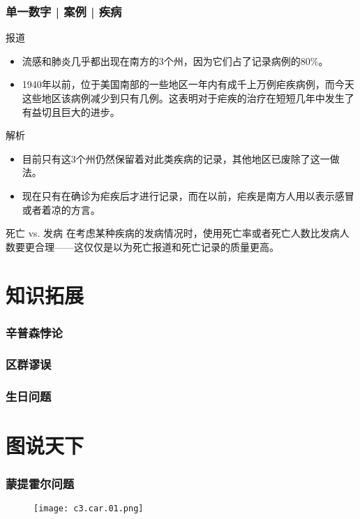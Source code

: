 \begin{frame}
  \frametitle{单一数字 | 案例 | 疾病}
  \begin{block}{报道}
    \begin{itemize}
      \item 流感和肺炎几乎都出现在南方的3个州，因为它们占了记录病例的80\%。
      \item 1940年以前，位于美国南部的一些地区一年内有成千上万例疟疾病例，而今天这些地区该病例减少到只有几例。这表明对于疟疾的治疗在短短几年中发生了有益切且巨大的进步。
    \end{itemize}
  \end{block}
  \pause
  \begin{block}{解析}
    \begin{itemize}
      \item 目前只有这3个州仍然保留着对此类疾病的记录，其他地区已废除了这一做法。
      \item 现在只有在确诊为疟疾后才进行记录，而在以前，疟疾是南方人用以表示感冒或者着凉的方言。
    \end{itemize}
  \end{block}
  \pause
  \begin{block}{死亡 vs. 发病}
    在考虑某种疾病的发病情况时，使用死亡率或者死亡人数比发病人数要更合理——这仅仅是以为死亡报道和死亡记录的质量更高。
  \end{block}
\end{frame}

\section{知识拓展}
\begin{frame}
  \frametitle{辛普森悖论}
\end{frame}

\begin{frame}
  \frametitle{区群谬误}
\end{frame}

\begin{frame}
  \frametitle{生日问题}
\end{frame}

\section{图说天下}
\begin{frame}
  \frametitle{蒙提霍尔问题}
  \begin{figure}
    \centering
    \texttt{[image: c3.car.01.png]}
  \end{figure}
\end{frame}

